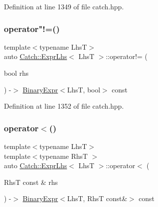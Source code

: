 Definition at line 1349 of file catch.\+hpp.

\mbox{\label{class_catch_1_1_expr_lhs_a60eca847201d057d8a8b7222c69b619c}} 
\subsubsection{\texorpdfstring{operator"!=()}{operator!=()}\hspace{0.1cm}{\footnotesize\ttfamily [2/2]}}
{\footnotesize\ttfamily template$<$typename LhsT$>$ \\
auto \mbox{\hyperlink{class_catch_1_1_expr_lhs}{Catch\+::\+Expr\+Lhs}}$<$ LhsT $>$\+::operator!= (\begin{DoxyParamCaption}\item[{bool}]{rhs }\end{DoxyParamCaption}) -\/$>$ \mbox{\hyperlink{class_catch_1_1_binary_expr}{Binary\+Expr}}$<$LhsT, bool$>$ const \hspace{0.3cm}{\ttfamily [inline]}}



Definition at line 1352 of file catch.\+hpp.

\mbox{\label{class_catch_1_1_expr_lhs_a55284221df2edb3542e765c87b5691b9}} 
\subsubsection{\texorpdfstring{operator$<$()}{operator<()}}
{\footnotesize\ttfamily template$<$typename LhsT$>$ \\
template$<$typename RhsT $>$ \\
auto \mbox{\hyperlink{class_catch_1_1_expr_lhs}{Catch\+::\+Expr\+Lhs}}$<$ LhsT $>$\+::operator$<$ (\begin{DoxyParamCaption}\item[{RhsT const \&}]{rhs }\end{DoxyParamCaption}) -\/$>$ \mbox{\hyperlink{class_catch_1_1_binary_expr}{Binary\+Expr}}$<$LhsT, RhsT const\&$>$ const \hspace{0.3cm}{\ttfamily [inline]}}




